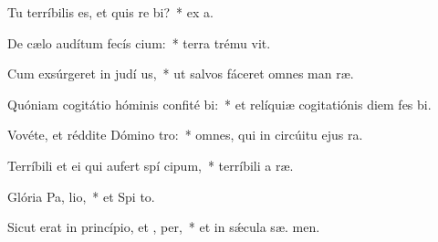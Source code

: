 \item Tu terríbilis es, et quis re bi?~* ex   a.
\item De cælo audítum fecís cium:~* terra trému  vit.
\item Cum exsúrgeret in judí us,~* ut salvos fáceret omnes man ræ.
\item Quóniam cogitátio hóminis confité bi:~* et relíquiæ cogitatiónis diem fes  bi.
\item Vovéte, et réddite Dómino  tro:~* omnes, qui in circúitu ejus  ra.
\item Terríbili et ei qui aufert spí cipum,~* terríbili a  ræ.
\item Glória Pa,  lio,~* et Spi to.
\item Sicut erat in princípio, et ,  per,~* et in sǽcula sæ. men.
